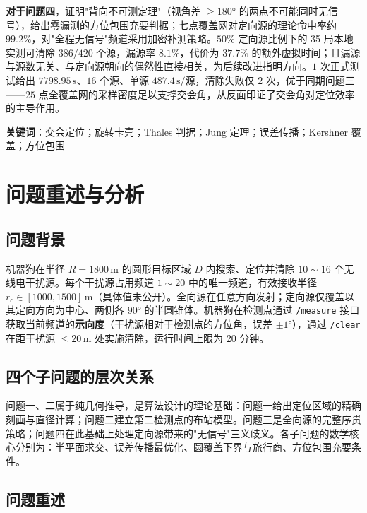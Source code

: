 \documentclass[12pt,a4paper]{ctexart}
\begin{document}
\textbf{对于问题四}，证明"背向不可测定理"（视角差 $\geq180°$ 的两点不可能同时无信号），给出零漏测的方位包围充要判据；七点覆盖网对定向源的理论命中率约 $99.2\%$，对"全程无信号"频道采用加密补测策略。$50\%$ 定向源比例下的 35 局本地实测可清除 $386/420$ 个源，漏源率 $8.1\%$，代价为 $37.7\%$ 的额外虚拟时间；且漏源与源数无关、与定向源朝向的偶然性直接相关，为后续改进指明方向。$1$ 次正式测试给出 $7798.95\,\text{s}$、$16$ 个源、单源 $487.4\,\text{s}/\text{源}$，清除失败仅 $2$ 次，优于同期问题三——$25$ 点全覆盖网的采样密度足以支撑交会角，从反面印证了交会角对定位效率的主导作用。

\vspace{0.5em}
\noindent\textbf{关键词}：交会定位；旋转卡壳；Thales 判据；Jung 定理；误差传播；Kershner 覆盖；方位包围

\newpage
\tableofcontents
\newpage

\section{问题重述与分析}
\label{sec:intro}

\subsection{问题背景}

机器狗在半径 $R=1800\,\text{m}$ 的圆形目标区域 $D$ 内搜索、定位并清除 $10\sim16$ 个无线电干扰源。每个干扰源占用频道 $1\sim20$ 中的唯一频道，有效接收半径 $r_c\in[1000,1500]\,\text{m}$（具体值未公开）。全向源在任意方向发射；定向源仅覆盖以其定向方向为中心、两侧各 $90°$ 的半圆锥体。机器狗在检测点通过 \texttt{/measure} 接口获取当前频道的\textbf{示向度}（干扰源相对于检测点的方位角，误差 $\pm1°$），通过 \texttt{/clear} 在距干扰源 $\leq20\,\text{m}$ 处实施清除，运行时间上限为 20 分钟。

\subsection{四个子问题的层次关系}

问题一、二属于纯几何推导，是算法设计的理论基础：问题一给出定位区域的精确刻画与直径计算；问题二建立第二检测点的布站模型。问题三是全向源的完整序贯策略；问题四在此基础上处理定向源带来的"无信号"三义歧义。各子问题的数学核心分别为：半平面求交、误差传播最优化、圆覆盖下界与旅行商、方位包围充要条件。

\subsection{问题重述}
\end{document}
